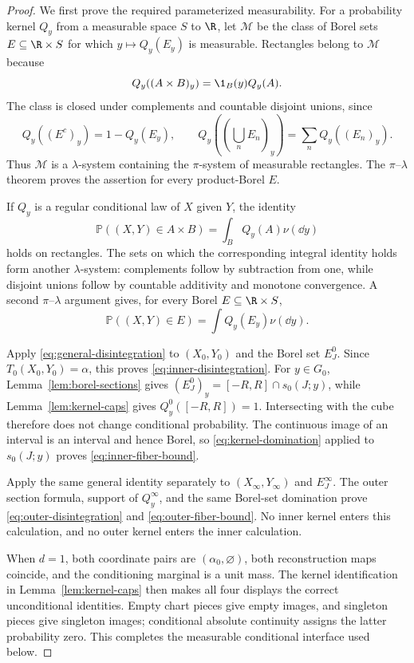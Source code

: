 \begin{proof}
We first prove the required parameterized measurability.  For a probability
kernel $Q_y$ from a measurable space $S$ to $\R$, let $\mathcal M$ be the
class of Borel sets $E\subseteq\R\times S$ for which
$y\mapsto Q_y(E_y)$ is measurable.  Rectangles belong to $\mathcal M$
because
\[
Q_y((A\times B)_y)=\1_B(y)Q_y(A).
\]
The class is closed under complements and countable disjoint unions, since
\[
Q_y((E^c)_y)=1-Q_y(E_y),\qquad
Q_y\left(\left(\bigcup_nE_n\right)_y\right)=\sum_nQ_y((E_n)_y).
\]
Thus $\mathcal M$ is a $\lambda$-system containing the $\pi$-system of
measurable rectangles.  The $\pi$--$\lambda$ theorem proves the assertion
for every product-Borel $E$.

If $Q_y$ is a regular conditional law of $X$ given $Y$, the identity
\[
\mathbb P((X,Y)\in A\times B)=\int_BQ_y(A)\nu(\dd y)
\]
holds on rectangles.  The sets on which the corresponding integral identity
holds form another $\lambda$-system: complements follow by subtraction from
one, while disjoint unions follow by countable additivity and monotone
convergence.  A second $\pi$--$\lambda$ argument gives, for every Borel
$E\subseteq\R\times S$,
\begin{equation}
\mathbb P((X,Y)\in E)=\int Q_y(E_y)\nu(\dd y).
\label{eq:general-disintegration}
\end{equation}

Apply \eqref{eq:general-disintegration} to $(X_0,Y_0)$ and the Borel set
$E^0_J$.  Since $T_0(X_0,Y_0)=\alpha$, this proves
\eqref{eq:inner-disintegration}.  For $y\in G_0$,
Lemma~\ref{lem:borel-sections} gives
$(E^0_J)_y=[-R,R]\cap s_0(J;y)$, while Lemma~\ref{lem:kernel-caps} gives
$Q^0_y([-R,R])=1$.  Intersecting with the cube therefore does not change
conditional probability.  The continuous image of an interval is an
interval and hence Borel, so \eqref{eq:kernel-domination} applied to
$s_0(J;y)$ proves \eqref{eq:inner-fiber-bound}.

Apply the same general identity separately to $(X_\infty,Y_\infty)$ and
$E^\infty_J$.  The outer section formula, support of $Q^\infty_y$, and the
same Borel-set domination prove \eqref{eq:outer-disintegration} and
\eqref{eq:outer-fiber-bound}.  No inner kernel enters this calculation, and
no outer kernel enters the inner calculation.

When $d=1$, both coordinate pairs are $(\alpha_0,\varnothing)$, both
reconstruction maps coincide, and the conditioning marginal is a unit mass.
The kernel identification in Lemma~\ref{lem:kernel-caps} then makes all four
displays the correct unconditional identities.  Empty chart pieces give
empty images, and singleton pieces give singleton images; conditional
absolute continuity assigns the latter probability zero.  This completes
the measurable conditional interface used below.
\end{proof}

